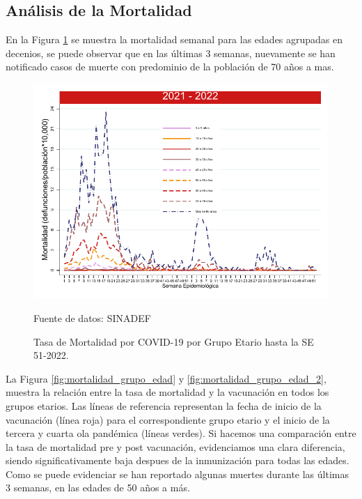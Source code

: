 \documentclass[12pt,a4paper,openany]{book}
\begin{document}
	\subsection*{Análisis de la Mortalidad}
	
	\noindent En la Figura \ref{fig:mortalidad_edad} se muestra la mortalidad semanal para las edades agrupadas en decenios, se puede observar que en las últimas 3 semanas, nuevamente se han notificado casos de muerte con predominio de la población de 70 años a mas.
	
	\begin{figure}[h]
		\caption{Tasa de Mortalidad por COVID-19 por Grupo Etario hasta la SE 51-2022.}\label{fig:mortalidad_edad}
		\begin{center}
			\includegraphics[width=0.65\linewidth]{../figuras/mortalidad_edad_2021_2022.pdf}
		\end{center}
		{\footnotesize Fuente de datos: SINADEF} 
	\end{figure}
	
	
	La Figura \ref{fig:mortalidad_grupo_edad} y 
	\ref{fig:mortalidad_grupo_edad_2},
	muestra la relación entre la tasa de mortalidad y la vacunación en todos los grupos etarios. Las líneas de referencia  representan la fecha de inicio de la vacunación (línea roja) para el correspondiente grupo etario y el inicio de la tercera y cuarta ola pandémica (líneas verdes). Si hacemos una comparación entre la tasa de mortalidad pre y post vacunación, evidenciamos una clara diferencia, siendo significativamente baja despues de la inmunización para todas las edades. Como se puede evidenciar se han reportado algunas muertes durante las últimas 3 semanas, en las edades de 50 años a más.
	
\end{document}
